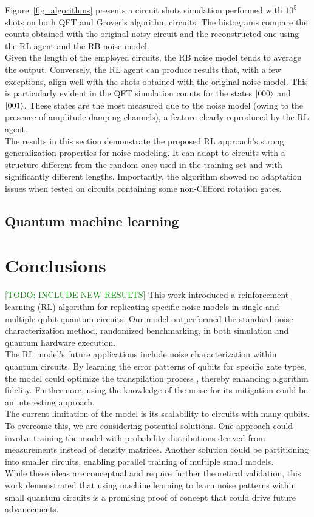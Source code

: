 \documentclass[referee,sn-basic]{sn-jnl} %
\newcommand{\todo}[1]{\textcolor{green}{[TODO: #1]}}
\begin{document}
\noindent
Figure~\ref{fig_algorithms} presents a circuit shots simulation performed with $10^5$ shots on both QFT 
and Grover's algorithm circuits. The histograms compare the counts obtained with the original noisy circuit 
and the reconstructed one using the RL agent and the RB noise model.\\
Given the length of the employed circuits, the RB noise model tends to average the output. Conversely, the RL 
agent can produce results that, with a few exceptions, align well with the shots obtained with the original 
noise model. This is particularly evident in the QFT simulation counts for the states $\ket{000}$ and 
$\ket{001}$. These states are the most measured due to the noise model (owing to the presence of amplitude 
damping channels), a feature clearly reproduced by the RL agent.\\
The results in this section demonstrate the proposed RL approach's strong generalization properties for noise 
modeling. It can adapt to circuits with a structure different from the random ones used in the training set 
and with significantly different lengths. Importantly, the algorithm showed no adaptation issues when tested 
on circuits containing some non-Clifford rotation gates.

\subsection{Quantum machine learning}

\section{Conclusions}
\todo{INCLUDE NEW RESULTS}
This work introduced a reinforcement learning (RL) algorithm for replicating specific noise models in 
single and multiple qubit quantum circuits. Our model outperformed the standard noise characterization 
method, randomized benchmarking, in both simulation and quantum hardware execution.\\
The RL model's future applications include noise characterization within quantum circuits. By learning 
the error patterns of qubits for specific gate types, the model could optimize the transpilation process 
\cite{9259930}, thereby enhancing algorithm fidelity. Furthermore, using the knowledge of the noise for 
its mitigation could be an interesting approach.\\
The current limitation of the model is its scalability to circuits with many qubits. To overcome this, 
we are considering potential solutions. One approach could involve training the model with probability 
distributions derived from measurements instead of density matrices. Another solution could be partitioning 
into smaller circuits, enabling parallel training of multiple small models.\\
While these ideas are conceptual and require further theoretical validation, this work demonstrated that 
using machine learning to learn noise patterns within small quantum circuits is a promising proof of concept 
that could drive future advancements.
\end{document}
